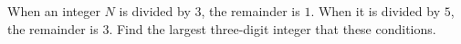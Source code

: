 When an integer $N$ is divided by $3$, the remainder is $1$. When it is divided by $5$, the remainder is $3$. Find the largest three-digit integer that these conditions.
